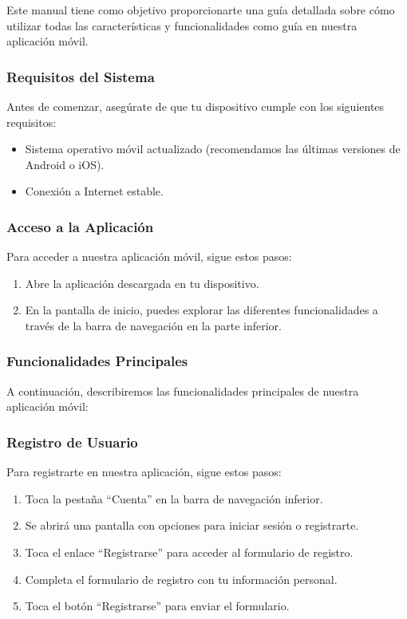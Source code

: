 Este manual tiene como objetivo proporcionarte una guía detallada sobre cómo utilizar todas las características y funcionalidades como guía en nuestra aplicación móvil.

\subsubsection{Requisitos del Sistema}
Antes de comenzar, asegúrate de que tu dispositivo cumple con los siguientes requisitos:

\begin{itemize}
	\item Sistema operativo móvil actualizado (recomendamos las últimas versiones de Android o iOS).
	\item Conexión a Internet estable.
\end{itemize}

\subsubsection{Acceso a la Aplicación}
Para acceder a nuestra aplicación móvil, sigue estos pasos:

\begin{enumerate}
	\item Abre la aplicación descargada en tu dispositivo.
	\item En la pantalla de inicio, puedes explorar las diferentes funcionalidades a través de la barra de navegación en la parte inferior.
\end{enumerate}

\subsubsection{Funcionalidades Principales}
A continuación, describiremos las funcionalidades principales de nuestra aplicación móvil:

\subsubsection{Registro de Usuario}
Para registrarte en nuestra aplicación, sigue estos pasos:

\begin{enumerate}
	\item Toca la pestaña “Cuenta” en la barra de navegación inferior.
	\item Se abrirá una pantalla con opciones para iniciar sesión o registrarte.
	\item Toca el enlace “Registrarse” para acceder al formulario de registro.
	\item Completa el formulario de registro con tu información personal.
	\item Toca el botón “Registrarse” para enviar el formulario.
\end{enumerate}

